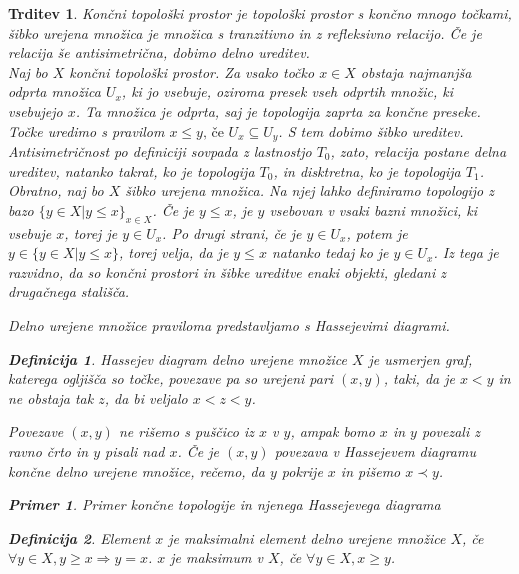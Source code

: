 \documentclass[a4paper,12pt]{article}
\theoremstyle{definition}
\newtheorem{definicija}{Definicija}
\theoremstyle{plain}
\theoremstyle{definition}
\newtheorem{primer}{Primer}
\theoremstyle{plain}
\newtheorem{trditev}{Trditev}
\theoremstyle{plain}
\theoremstyle{plain}
\theoremstyle{plain}
\begin{document}
\begin{trditev}
\textit{Končni topološki prostor} je topološki prostor s končno mnogo točkami, 
\textit{šibko urejena} množica je množica s tranzitivno in z refleksivno relacijo. Če je relacija še antisimetrična, dobimo \textit{delno} ureditev.
\\ \indent Naj bo $X$ končni topološki prostor. Za vsako točko $x \in X$ obstaja najmanjša odprta množica $U_x$, ki jo
vsebuje, oziroma presek vseh odprtih množic, ki vsebujejo $x$. Ta množica je odprta, saj je topologija zaprta za končne preseke.
    Točke uredimo s pravilom $ x\le y \text{, če } U_x \subseteq  U_y$. S tem dobimo šibko ureditev. 
    Antisimetričnost po definiciji sovpada z lastnostjo $T_0$, zato, relacija postane delna ureditev,
     natanko takrat, ko je topologija $T_0$, in disktretna, ko je topologija $T_1$.
    \\ \indent Obratno, naj bo $X$ šibko urejena množica. Na njej lahko definiramo topologijo z bazo $\{y \in X | y\le x\}_{x \in X}$. Če je
$y \le x$, je $y$ vsebovan v vsaki bazni množici, ki vsebuje $x$, torej je $y \in U_x$. Po drugi strani, če je $y\in
U_x$, potem je $y \in \{y \in X | y \le x\}$, torej velja, da je $y \le x$ natanko tedaj ko je $y \in U_x$. Iz tega je razvidno, da so končni prostori in šibke ureditve enaki objekti, gledani z drugačnega stališča.


Delno urejene množice praviloma predstavljamo s Hassejevimi diagrami.

\begin{definicija}
    \textit{Hassejev diagram} delno urejene množice $X$ je usmerjen graf, katerega ogljišča so točke, povezave pa so urejeni pari $(x,y)$, taki, da je  $x<y$ in ne obstaja tak $z$, da bi veljalo $x<z<y$.
\end{definicija}

Povezave $(x,y)$ ne rišemo s puščico iz $x$ v $y$, ampak bomo $x$ in $y$ povezali z ravno črto in $y$ pisali nad $x$. Če je $(x,y)$ povezava v Hassejevem diagramu končne delno urejene množice, rečemo, da $y$ \textit{pokrije} $x$ in pišemo $x\prec y$.

\begin{primer}
    Primer končne topologije in njenega Hassejevega diagrama
\end{primer}

\begin{definicija}
    Element $x$ je \textit{maksimalni element} delno urejene množice $X$, če $\forall y \in X, y\geq x \Rightarrow y = x$.
    $x$ je \textit{maksimum} v $X$, če $\forall y \in X, x\geq y$.
\end{definicija}


\end{trditev}
\end{document}
